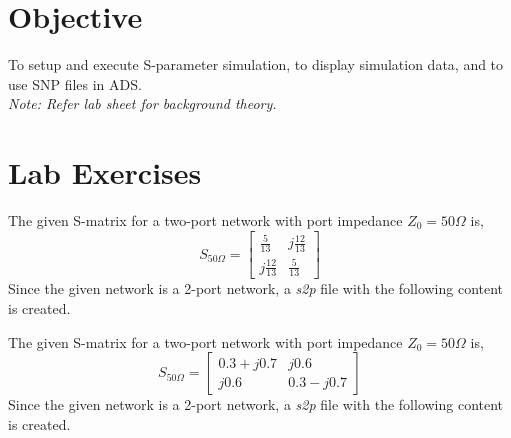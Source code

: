 \documentclass{lab_sheet}
\begin{document}
    \section{Objective}
    To setup and execute S-parameter simulation, to display simulation data, and to use SNP files in ADS.\\
    \textit{Note: Refer lab sheet for background theory.}
    \section{Lab Exercises}
    The given S-matrix for a two-port network with port impedance $Z_0=50\Omega$ is,
    \begin{equation*}
        S_{50\Omega}=\begin{bmatrix}
            \frac{5}{13} & j\frac{12}{13}\\
            j\frac{12}{13} & \frac{5}{13}
            \end{bmatrix}
    \end{equation*}
    Since the given network is a 2-port network, a \textit{s2p} file with the following content is created.




    The given S-matrix for a two-port network with port impedance $Z_0=50\Omega$ is,
    \begin{equation*}
        S_{50\Omega}=\begin{bmatrix}
            0.3+j0.7&j0.6\\
            j0.6&0.3-j0.7
            \end{bmatrix}
    \end{equation*}
    Since the given network is a 2-port network, a \textit{s2p} file with the following content is created.



\end{document}
